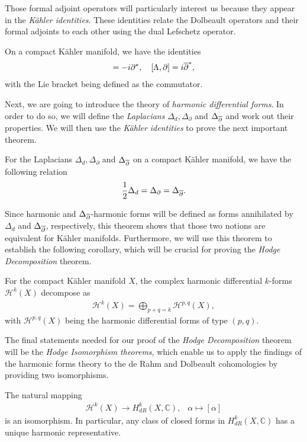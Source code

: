 Those formal adjoint operators will particularly interest us because they appear in the \emph{Kähler
	identities}. These identities relate the Dolbeault operators and their formal adjoints to each other
using the dual Lefschetz operator. 
\begin{thm}
	On a compact Kähler manifold, we have the identities
	\begin{align*}
		[\Lambda,\opartial] = -i\partial^*, \quad [\Lambda,\partial] = i\opartial^*,
	\end{align*}
	with the Lie bracket being defined as the commutator.
\end{thm}
Next, we are going to introduce the theory of \emph{harmonic differential forms}. In order to do so,
we will define the \emph{Laplacians} $\Delta_d, \Delta_\partial$ and $\Delta_{\overline{\partial}}$ and work out
their properties. We will then use the \emph{Kähler identities} to prove the next important theorem.
\begin{thm}
	For the Laplacians $\Delta_d, \Delta_\partial$ and $\Delta_{\overline{\partial}}$ on a compact Kähler manifold,
	we have the following relation
	\begin{align*}
		\frac{1}{2}\Delta_d = \Delta_\partial = \Delta_{\overline{\partial}}.
	\end{align*}
\end{thm}
Since harmonic and $\Delta_{\overline{\partial}}$-harmonic forms will be defined as forms annihilated by
$\Delta_d$ and $\Delta_{\overline{\partial}}$, respectively, this theorem shows that those two notions are
equivalent for Kähler manifolds. Furthermore, we will use this theorem to establish the following
corollary, which will be crucial for proving the \emph{Hodge Decomposition} theorem.
\begin{cor}
	For the compact Kähler manifold $X$, the complex harmonic differential $k$-forms $\mathcal{H}^k(X)$
	decompose as 
	\begin{align*}
		\mathcal{H}^k(X) = \bigoplus_{p+q=k}\mathcal{H}^{p,q}(X),
	\end{align*}
	with $\mathcal{H}^{p,q}(X)$ being the harmonic differential forms of type $(p,q)$.
\end{cor}
The final statements needed for our proof of the \emph{Hodge Decomposition} theorem will be the
\emph{Hodge Isomorphism theorems}, which enable us to apply the findings of the harmonic forms
theory to the de Rahm and Dolbeault cohomologies by providing two isomorphisms.
\begin{thm}
	The natural mapping
	\begin{align*}
		\mathcal{H}^k(X) \rightarrow H^k_{dR}(X,\mathbb{C}), \;\enspace
		\alpha \mapsto [\alpha]
	\end{align*}
	is an isomorphism. In particular, any class of closed forms in $H^k_{dR}(X,\mathbb{C})$ has a
	unique harmonic
	representative.
\end{thm}

